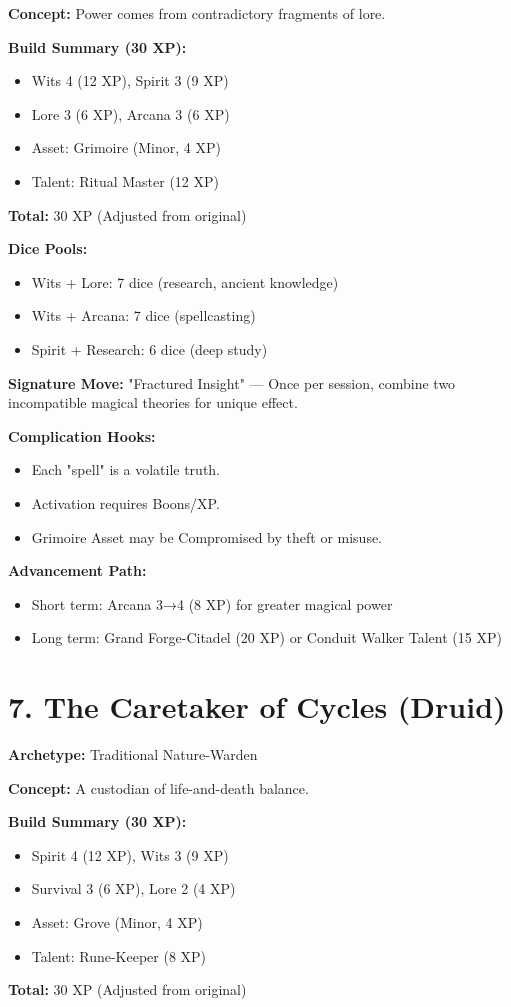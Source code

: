 \textbf{Concept:} Power comes from contradictory fragments of lore.

\textbf{Build Summary (30 XP):}
\begin{itemize}
  \item Wits 4 (12 XP), Spirit 3 (9 XP)
  \item Lore 3 (6 XP), Arcana 3 (6 XP)
  \item Asset: Grimoire (Minor, 4 XP)
  \item Talent: Ritual Master (12 XP)
\end{itemize}
\textbf{Total:} 30 XP (Adjusted from original)

\textbf{Dice Pools:}
\begin{itemize}
  \item Wits + Lore: 7 dice (research, ancient knowledge)
  \item Wits + Arcana: 7 dice (spellcasting)
  \item Spirit + Research: 6 dice (deep study)
\end{itemize}

\textbf{Signature Move:} "Fractured Insight" — Once per session, combine two incompatible magical theories for unique effect.

\textbf{Complication Hooks:}
\begin{itemize}
  \item Each "spell" is a volatile truth.
  \item Activation requires Boons/XP.
  \item Grimoire Asset may be Compromised by theft or misuse.
\end{itemize}

\textbf{Advancement Path:}
\begin{itemize}
  \item Short term: Arcana 3→4 (8 XP) for greater magical power
  \item Long term: Grand Forge-Citadel (20 XP) or Conduit Walker Talent (15 XP)
\end{itemize}

\section{7. The Caretaker of Cycles (Druid)}
\textbf{Archetype:} Traditional Nature-Warden

\textbf{Concept:} A custodian of life-and-death balance.

\textbf{Build Summary (30 XP):}
\begin{itemize}
  \item Spirit 4 (12 XP), Wits 3 (9 XP)
  \item Survival 3 (6 XP), Lore 2 (4 XP)
  \item Asset: Grove (Minor, 4 XP)
  \item Talent: Rune-Keeper (8 XP)
\end{itemize}
\textbf{Total:} 30 XP (Adjusted from original)

